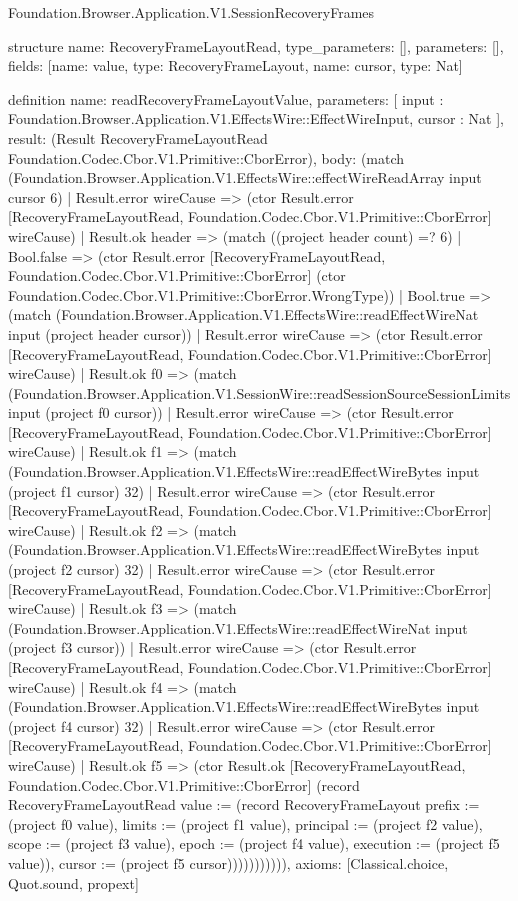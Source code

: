 \begin{lexlean}{Foundation.Browser.Application.V1.SessionRecoveryFrames}
\begin{semanticmodule}
structure{
  name: RecoveryFrameLayoutRead,
  type_parameters: [],
  parameters: [],
  fields: [{name: value, type: RecoveryFrameLayout}, {name: cursor, type: Nat}]
}

definition{
  name: readRecoveryFrameLayoutValue,
  parameters: [
    input : Foundation.Browser.Application.V1.EffectsWire::EffectWireInput,
    cursor : Nat
  ],
  result: (Result RecoveryFrameLayoutRead Foundation.Codec.Cbor.V1.Primitive::CborError),
  body: (match (Foundation.Browser.Application.V1.EffectsWire::effectWireReadArray input cursor 6)
    | Result.error wireCause => (ctor Result.error [RecoveryFrameLayoutRead, Foundation.Codec.Cbor.V1.Primitive::CborError] wireCause)
    | Result.ok header => (match ((project header count) =? 6)
      | Bool.false => (ctor Result.error [RecoveryFrameLayoutRead, Foundation.Codec.Cbor.V1.Primitive::CborError] (ctor Foundation.Codec.Cbor.V1.Primitive::CborError.WrongType))
      | Bool.true => (match (Foundation.Browser.Application.V1.EffectsWire::readEffectWireNat input (project header cursor))
        | Result.error wireCause => (ctor Result.error [RecoveryFrameLayoutRead, Foundation.Codec.Cbor.V1.Primitive::CborError] wireCause)
        | Result.ok f0 => (match (Foundation.Browser.Application.V1.SessionWire::readSessionSourceSessionLimits input (project f0 cursor))
          | Result.error wireCause => (ctor Result.error [RecoveryFrameLayoutRead, Foundation.Codec.Cbor.V1.Primitive::CborError] wireCause)
          | Result.ok f1 => (match (Foundation.Browser.Application.V1.EffectsWire::readEffectWireBytes input (project f1 cursor) 32)
            | Result.error wireCause => (ctor Result.error [RecoveryFrameLayoutRead, Foundation.Codec.Cbor.V1.Primitive::CborError] wireCause)
            | Result.ok f2 => (match (Foundation.Browser.Application.V1.EffectsWire::readEffectWireBytes input (project f2 cursor) 32)
              | Result.error wireCause => (ctor Result.error [RecoveryFrameLayoutRead, Foundation.Codec.Cbor.V1.Primitive::CborError] wireCause)
              | Result.ok f3 => (match (Foundation.Browser.Application.V1.EffectsWire::readEffectWireNat input (project f3 cursor))
                | Result.error wireCause => (ctor Result.error [RecoveryFrameLayoutRead, Foundation.Codec.Cbor.V1.Primitive::CborError] wireCause)
                | Result.ok f4 => (match (Foundation.Browser.Application.V1.EffectsWire::readEffectWireBytes input (project f4 cursor) 32)
                  | Result.error wireCause => (ctor Result.error [RecoveryFrameLayoutRead, Foundation.Codec.Cbor.V1.Primitive::CborError] wireCause)
                  | Result.ok f5 => (ctor Result.ok [RecoveryFrameLayoutRead, Foundation.Codec.Cbor.V1.Primitive::CborError] (record RecoveryFrameLayoutRead {value := (record RecoveryFrameLayout {prefix := (project f0 value), limits := (project f1 value), principal := (project f2 value), scope := (project f3 value), epoch := (project f4 value), execution := (project f5 value)}), cursor := (project f5 cursor)})))))))))),
  axioms: [Classical.choice, Quot.sound, propext]
}


\end{semanticmodule}
\end{lexlean}

